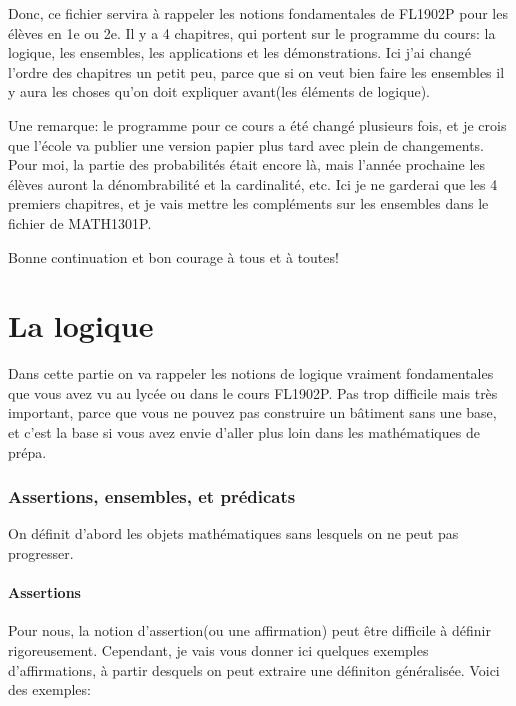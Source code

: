 \documentclass{article}
\begin{document}
Donc, ce fichier servira à rappeler les notions fondamentales de FL1902P pour les élèves en 1e ou 2e. Il y a 4 chapitres, qui portent sur le programme du cours: la logique, les ensembles, les applications et les démonstrations. Ici j'ai changé l'ordre des chapitres un petit peu, parce que si on veut bien faire les ensembles il y aura les choses qu'on doit expliquer avant(les éléments de logique).

Une remarque: le programme pour ce cours a été changé plusieurs fois, et je crois que l'école va publier une version papier plus tard avec plein de changements. Pour moi, la partie des probabilités était encore là, mais l'année prochaine les élèves auront la dénombrabilité et la cardinalité, etc. Ici je ne garderai que les 4 premiers chapitres, et je vais mettre les compléments sur les ensembles dans le fichier de MATH1301P.

Bonne continuation et bon courage à tous et à toutes!



\newpage
\tableofcontents

\newpage



\part{La logique}

Dans cette partie on va rappeler les notions de logique vraiment fondamentales que vous avez vu au lycée ou dans le cours FL1902P. Pas trop difficile mais très important, parce que vous ne pouvez pas construire un bâtiment sans une base, et c'est la base si vous avez envie d'aller plus loin dans les mathématiques de prépa.



\section{Assertions, ensembles, et prédicats}

On définit d'abord les objets mathématiques sans lesquels on ne peut pas progresser. 

\subsection{Assertions}

Pour nous, la notion d'assertion(ou une affirmation) peut être difficile à définir rigoreusement. Cependant, je vais vous donner ici quelques exemples d'affirmations, à partir desquels on peut extraire une définiton généralisée. Voici des exemples:
\end{document}
